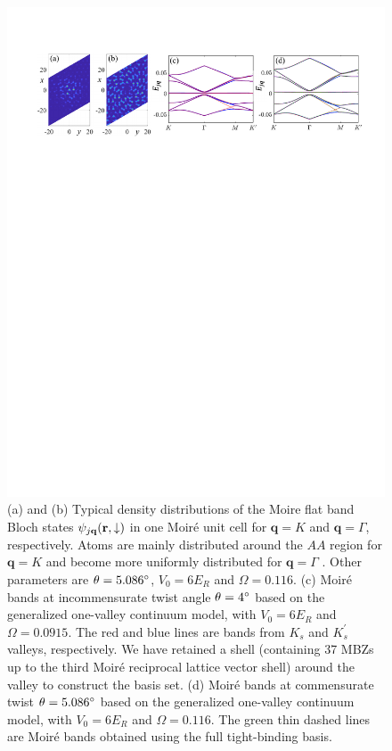 \documentclass[twocolumn,english,prl,floatfix,citeautoscript,nofootinbib]{revtex4}
\begin{document}
\begin{widetext}
\begin{figure}[b]
\includegraphics[width=1.0\linewidth]{FigS2.pdf}
\caption{(a) and (b) Typical density distributions of the Moire flat band
Bloch states $\protect\psi _{j\mathbf{q}}(\mathbf{r},\downarrow )$ in one
Moir\'{e} unit cell for $\mathbf{q}=K$ and $\mathbf{q}=\Gamma $,
respectively. Atoms are mainly distributed around the $AA$ region for $%
\mathbf{q}=K$ and become more uniformly distributed for $\mathbf{q}=\Gamma $%
. Other parameters are $\protect\theta =5.086^{\circ }$, $V_{0}=6E_{R}$ and $%
\Omega =0.116$. (c) Moir\'{e} bands at incommensurate twist angle $\protect%
\theta =4^{\circ }$ based on the generalized one-valley continuum model,
with $V_{0}=6E_{R}$ and $\Omega =0.0915$. The red and blue lines are bands
from $K_{s}$ and $K_{s}^{\prime }$ valleys, respectively. We have retained a
shell (containing 37 MBZs up to the third Moir\'{e} reciprocal lattice
vector shell) around the valley to construct the basis set. (d) Moir\'{e}
bands at commensurate twist $\protect\theta =5.086^{\circ }$ based on the
generalized one-valley continuum model, with $V_{0}=6E_{R}$ and $\Omega
=0.116$. The green thin dashed lines are Moir\'{e} bands obtained using the
full tight-binding basis.}
\label{fig:S2}
\end{figure}


\end{widetext}
\end{document}
